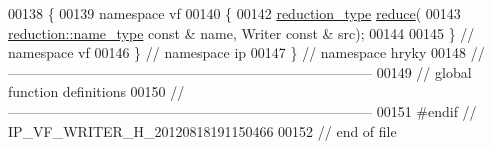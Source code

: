 \begin{DoxyCode}
00138 \{
00139 \textcolor{keyword}{namespace }vf
00140 \{
00142     \hyperlink{namespacehryky_a343a9a4c36a586be5c2693156200eadc}{reduction_type} \hyperlink{namespacehryky_af41cb3af6766761da0ff21b84527a52c}{reduce}(
00143         \hyperlink{namespacehryky_1_1reduction_ac686c30a4c8d196bbd0f05629a6b921f}{reduction::name_type} \textcolor{keyword}{const} & name, Writer \textcolor{keyword}{const} & src);
00144 
00145 \} \textcolor{comment}{// namespace vf}
00146 \} \textcolor{comment}{// namespace ip}
00147 \} \textcolor{comment}{// namespace hryky}
00148 \textcolor{comment}{//
      ------------------------------------------------------------------------------}
00149 \textcolor{comment}{// global function definitions}
00150 \textcolor{comment}{//
      ------------------------------------------------------------------------------}
00151 \textcolor{preprocessor}{#endif // IP\_VF\_WRITER\_H\_20120818191150466}
00152 \textcolor{preprocessor}{}\textcolor{comment}{// end of file}
\end{DoxyCode}
